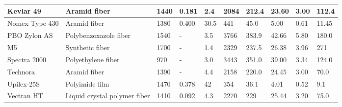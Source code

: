 \begin{table}[H]
\begin{tabular}{p{}|p{}|p{}|p{}|p{}|p{}|p{}|p{}|p{}|p{}}
Kevlar 49   & Aramid fiber                 & 1440                                 & 0.181                                     & 2.4                          & 2084                             & 212.4                      & 23.60                            & 3.00                       & 112.4                                     \\ \hline
Nomex Type 430 & Aramid fiber                 & 1380                                 & 0.400                                     & 30.5                         & 441                              & 45.0                       & 5.00                             & 0.61                       & 11.45                                      \\ \hline
PBO Zylon AS                 & Polybenzoxazole fiber        & 1540                                 & -                                          & 3.5                          & 3766                             & 383.9                      & 42.66                            & 5.80                       & 180.0                                           \\ \hline
M5 & Synthetic fiber & 1700 & - & 1.4 & 2329 & 237.5 & 26.38 & 3.96 & 271 \\ \hline
Spectra 2000 & Polyethylene fiber           & 970                                  & -                                          & 3.0                            & 3443                             & 351.0                      & 39.00                            & 3.34                       & 124.0                             \\ \hline
Technora                     & Aramid fiber                 & 1390                                 & -                                          & 4.4                          & 2158                             & 220.0                      & 24.45                            & 3.00                       & 70.0                                     \\ \hline
Upilex-25S                   & Polyimide film               & 1470                                 & 0.378                                     & 42                           & 354                              & 36.1                       & 4.01                             & 0.52                       & 9.1                                             \\ \hline
Vectran HT                   & Liquid crystal polymer fiber & 1410                                 & 0.092                                     & 4.3                          & 2270                             & 229                        & 25.44                            & 3.20                       & 75.0                                 \\ \hline

\end{tabular}
\end{table}
